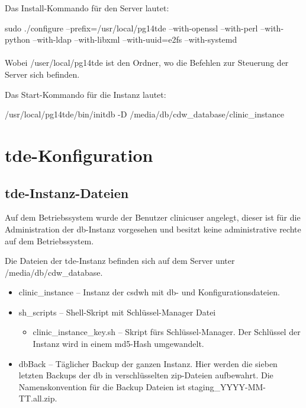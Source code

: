     Das Install-Kommando für den Server lautet: 
           
    sudo ./configure --prefix=/usr/local/pg14tde --with-openssl --with-perl --with-python --with-ldap --with-libxml --with-uuid=e2fs --with-systemd\\ \\
    
    Wobei /user/local/pg14tde ist den Ordner, wo die Befehlen zur Steuerung der Server sich befinden.
    
    Das Start-Kommando für die Instanz lautet: 
    
    /usr/local/pg14tde/bin/initdb -D /media/db/cdw\_database/clinic\_instance
    

	\section{\acs{tde}-Konfiguration} 
	
    \subsection{\acs{tde}-Instanz-Dateien}
    Auf dem Betriebssystem wurde der Benutzer \textsf{clinicuser} angelegt, dieser ist für die Administration der \ac{db}-Instanz vorgesehen und besitzt keine administrative rechte auf dem Betriebssystem.
    
    Die Dateien der \ac{tde}-Instanz befinden sich auf dem Server unter \textsf{/media/db/cdw\_database}.
    \begin{itemize}
    	\item \textsf{clinic\_instance} -- Instanz der \ac{csdwh} mit \ac{db}- und Konfigurationsdateien.
    	\item \textsf{sh\_scripts} -- Shell-Skript mit Schlüssel-Manager Datei
    	\begin{itemize}
           \item \textsf{clinic\_instance\_key.sh} -- Skript fürs Schlüssel-Manager. Der Schlüssel der Instanz wird in einem \ac{md5}-Hash umgewandelt.
    	\end{itemize}
    	\item \textsf{dbBack} -- Täglicher Backup der ganzen Instanz. Hier werden die sieben letzten Backups der \ac{db} in verschlüsselten \ac{zip}-Dateien aufbewahrt. Die Namenskonvention für die Backup Dateien ist \textsf{staging\_YYYY-MM-TT.all.zip}.
    \end{itemize}

